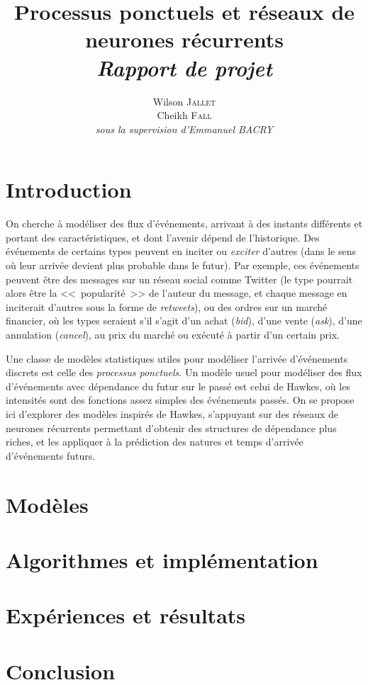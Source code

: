 \documentclass[11pt]{article}
\title{\textbf{Processus ponctuels et réseaux de neurones récurrents}\\
	\textit{Rapport de projet}  
}
\author{
  Wilson \textsc{Jallet}\\
  Cheikh \textsc{Fall}\\
  \textit{sous la supervision d'Emmanuel BACRY}
}
\begin{document}
\maketitle

\section{Introduction}

On cherche à modéliser des flux d'événements, arrivant à des instants différents et portant des caractéristiques, et dont l'avenir dépend de l'historique. Des événements de certains types peuvent en inciter ou \textit{exciter} d'autres (dans le sens où leur arrivée devient plus probable dans le futur). Par exemple, ces événements peuvent être des messages sur un réseau social comme Twitter (le type pourrait alors être la <<~popularité~>> de l'auteur du message, et chaque message en inciterait d'autres sous la forme de \textit{retweets}), ou des ordres sur un marché financier, où les types seraient s'il s'agit d'un achat (\textit{bid}), d'une vente (\textit{ask}), d'une annulation (\textit{cancel}), au prix du marché ou exécuté à partir d'un certain prix.

Une classe de modèles statistiques utiles pour modéliser l'arrivée d'événements discrets est celle des \textit{processus ponctuels}. Un modèle usuel pour modéliser des flux d'événements avec dépendance du futur sur le passé est celui de Hawkes, où les intensités sont des fonctions assez simples des événements passés. On se propose ici d'explorer des modèles inspirés de Hawkes, s'appuyant sur des réseaux de neurones récurrents permettant d'obtenir des structures de dépendance plus riches, et les appliquer à la prédiction des natures et temps d'arrivée d'événements futurs.

\section{Modèles}




\section{Algorithmes et implémentation}



\section{Expériences et résultats}




\printbibliography

\begin{appendices}
	


\end{appendices}

\section{Conclusion}
\end{document}
